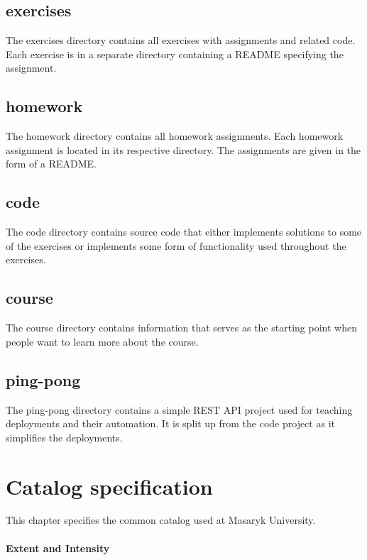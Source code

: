 \documentclass[
  digital,
  color,
  oneside,
  nosansbold,
  nocolorbold,
  lof,
  lot,
]{fithesis4}
\begin{document}
\section{exercises}

The exercises directory contains all exercises with assignments and related code. Each exercise is in a separate directory containing a README specifying the assignment.

\section{homework}

The homework directory contains all homework assignments. Each homework assignment is located in its respective directory. The assignments are given in the form of a README.

\section{code}

The code directory contains source code that either implements solutions to some of the exercises or implements some form of functionality used throughout the exercises.
\section{course}

The course directory contains information that serves as the starting point when people want to learn more about the course.
\section{ping-pong}

The ping-pong directory contains a simple REST API project used for teaching deployments and their automation. It is split up from the code project as it simplifies the deployments.

\chapter{Catalog specification}

This chapter specifies the common catalog used at Masaryk University.

\subsubsection{Extent and Intensity}
\end{document}
